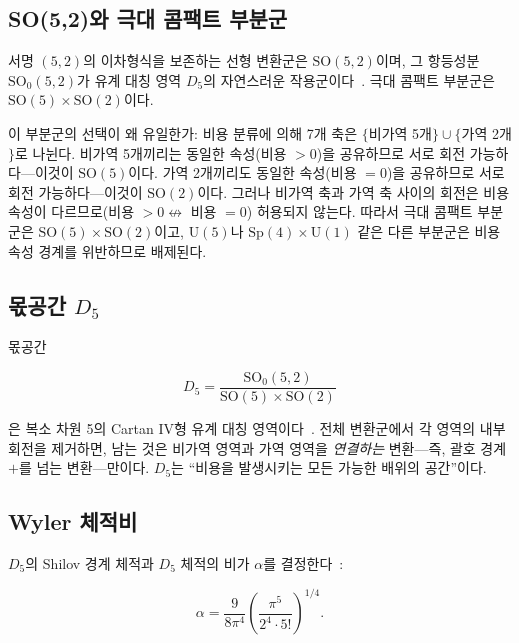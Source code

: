\documentclass[entropy,article,submit,pdftex,oneauthor]{Definitions/mdpi}
\begin{document}
\subsection{SO(5,2)와 극대 콤팩트 부분군}

서명 $(5,2)$의 이차형식을 보존하는 선형 변환군은 $\mathrm{SO}(5,2)$이며, 그 항등성분 $\mathrm{SO}_0(5,2)$가 유계 대칭 영역 $D_5$의 자연스러운 작용군이다~\cite{helgason1978}. 극대 콤팩트 부분군은 $\mathrm{SO}(5) \times \mathrm{SO}(2)$이다.

이 부분군의 선택이 왜 유일한가: 비용 분류에 의해 7개 축은 $\{$비가역 5개$\} \cup \{$가역 2개$\}$로 나뉜다. 비가역 5개끼리는 동일한 속성(비용 $> 0$)을 공유하므로 서로 회전 가능하다---이것이 $\mathrm{SO}(5)$이다. 가역 2개끼리도 동일한 속성(비용 $= 0$)을 공유하므로 서로 회전 가능하다---이것이 $\mathrm{SO}(2)$이다. 그러나 비가역 축과 가역 축 사이의 회전은 비용 속성이 다르므로(비용 $> 0 \not\leftrightarrow$ 비용 $= 0$) 허용되지 않는다. 따라서 극대 콤팩트 부분군은 $\mathrm{SO}(5) \times \mathrm{SO}(2)$이고, $\mathrm{U}(5)$나 $\mathrm{Sp}(4) \times \mathrm{U}(1)$ 같은 다른 부분군은 비용 속성 경계를 위반하므로 배제된다.

\subsection{몫공간 $D_5$}

몫공간
\begin{linenomath}
\begin{equation}
D_5 = \frac{\mathrm{SO}_0(5,2)}{\mathrm{SO}(5) \times \mathrm{SO}(2)}
\label{eq:d5}
\end{equation}
\end{linenomath}
은 복소 차원 5의 Cartan IV형 유계 대칭 영역이다~\cite{helgason1978,hua1963}. 전체 변환군에서 각 영역의 내부 회전을 제거하면, 남는 것은 비가역 영역과 가역 영역을 \emph{연결하는} 변환---즉, 괄호 경계 $+$를 넘는 변환---만이다. $D_5$는 ``비용을 발생시키는 모든 가능한 배위의 공간''이다.

\subsection{Wyler 체적비}

$D_5$의 Shilov 경계 체적과 $D_5$ 체적의 비가 $\alpha$를 결정한다~\cite{wyler1969,wyler1971,hua1963}:
\begin{linenomath}
\begin{equation}
\alpha = \frac{9}{8\pi^4} \left( \frac{\pi^5}{2^4 \cdot 5!} \right)^{1/4}.
\label{eq:wyler-formula}
\end{equation}
\end{linenomath}
\end{document}
